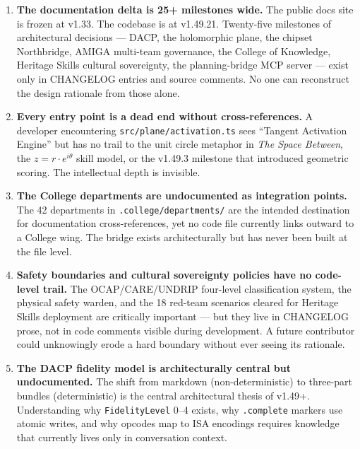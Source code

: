 \documentclass[11pt,letterpaper]{article}
\begin{document}
\begin{enumerate}
  \item \textbf{The documentation delta is 25+ milestones wide.} The public docs site is frozen at v1.33. The codebase is at v1.49.21. Twenty-five milestones of architectural decisions --- DACP, the holomorphic plane, the chipset Northbridge, AMIGA multi-team governance, the College of Knowledge, Heritage Skills cultural sovereignty, the planning-bridge MCP server --- exist only in CHANGELOG entries and source comments. No one can reconstruct the design rationale from those alone.

  \item \textbf{Every entry point is a dead end without cross-references.} A developer encountering \texttt{src/plane/activation.ts} sees ``Tangent Activation Engine'' but has no trail to the unit circle metaphor in \textit{The Space Between}, the $z = r \cdot e^{i\theta}$ skill model, or the v1.49.3 milestone that introduced geometric scoring. The intellectual depth is invisible.

  \item \textbf{The College departments are undocumented as integration points.} The 42 departments in \texttt{.college/departments/} are the intended destination for documentation cross-references, yet no code file currently links outward to a College wing. The bridge exists architecturally but has never been built at the file level.

  \item \textbf{Safety boundaries and cultural sovereignty policies have no code-level trail.} The OCAP/CARE/UNDRIP four-level classification system, the physical safety warden, and the 18 red-team scenarios cleared for Heritage Skills deployment are critically important --- but they live in CHANGELOG prose, not in code comments visible during development. A future contributor could unknowingly erode a hard boundary without ever seeing its rationale.

  \item \textbf{The DACP fidelity model is architecturally central but undocumented.} The shift from markdown (non-deterministic) to three-part bundles (deterministic) is the central architectural thesis of v1.49+. Understanding why \texttt{FidelityLevel} 0--4 exists, why \texttt{.complete} markers use atomic writes, and why opcodes map to ISA encodings requires knowledge that currently lives only in conversation context.
\end{enumerate}
\end{document}
